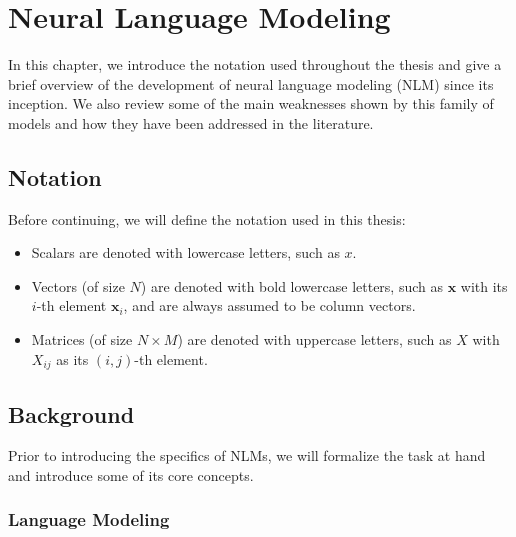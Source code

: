 \chapter{Neural Language Modeling}

In this chapter, we introduce the notation used throughout the thesis and give a brief overview of the development of neural language modeling (NLM) since its inception. We also review some of the main weaknesses shown by this family of models and how they have been addressed in the literature. 


\section{Notation}
\label{sec:notation}

Before continuing, we will define the notation used in this thesis:

\begin{itemize}
	\item Scalars are denoted with lowercase letters, such as $x$.
	
	\item Vectors (of size $N$) are denoted with bold lowercase letters, such as $\mathbf{x}$ with its $i$-th element $\mathbf{x}_i$, and are always assumed to be column vectors.
	
	\item Matrices (of size $N \times M$) are denoted with uppercase letters, such as $X$ with $X_{ij}$ as its $(i,j)$-th element.
\end{itemize}

\section{Background}
\label{sec:background}

Prior to introducing the specifics of NLMs, we will formalize the task at hand and introduce some of its core concepts. 

\subsection{Language Modeling}

